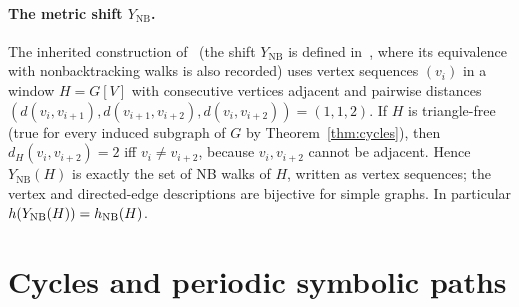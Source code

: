 \paragraph{The metric shift $Y_{\mathrm{NB}}$.}
The inherited construction of~\cite{USTAGE,UENT} (the shift $Y_{\mathrm{NB}}$ is defined in~\cite{USTAGE}, where its equivalence with nonbacktracking walks is also recorded) uses vertex sequences $(v_i)$ in a window $H=G[V]$ with consecutive vertices adjacent and pairwise distances $(d(v_i,v_{i+1}),d(v_{i+1},v_{i+2}),d(v_i,v_{i+2}))=(1,1,2)$. If $H$ is triangle-free (true for every induced subgraph of $G$ by Theorem~\ref{thm:cycles}), then $d_H(v_i,v_{i+2})=2$ iff $v_i\ne v_{i+2}$, because $v_i,v_{i+2}$ cannot be adjacent. Hence $Y_{\mathrm{NB}}(H)$ is exactly the set of NB walks of $H$, written as vertex sequences; the vertex and directed-edge descriptions are bijective for simple graphs. In particular $h(Y_{\mathrm{NB}}(H))=h_{\mathrm{NB}}(H)$.

\section{Cycles and periodic symbolic paths}\label{sec:cycles}

